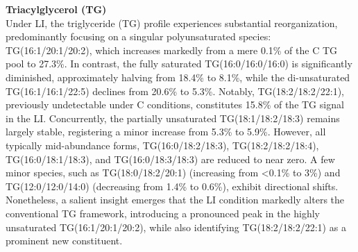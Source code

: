 \documentclass[10pt,letterpaper]{article}
\begin{document}
\textbf{Triacylglycerol (TG)}  \\
Under LI, the triglyceride (TG) profile experiences substantial reorganization, predominantly focusing on a singular polyunsaturated species: TG(16:1/20:1/20:2), which increases markedly from a mere 0.1\% of the C TG pool to 27.3\%. In contrast, the fully saturated TG(16:0/16:0/16:0) is significantly diminished, approximately halving from 18.4\% to 8.1\%, while the di-unsaturated TG(16:1/16:1/22:5) declines from 20.6\% to 5.3\%. Notably, TG(18:2/18:2/22:1), previously undetectable under C conditions, constitutes 15.8\% of the TG signal in the LI. Concurrently, the partially unsaturated TG(18:1/18:2/18:3) remains largely stable, registering a minor increase from 5.3\% to 5.9\%. However, all typically mid-abundance forms, TG(16:0/18:2/18:3), TG(18:2/18:2/18:4), TG(16:0/18:1/18:3), and TG(16:0/18:3/18:3) are reduced to near zero. A few minor species, such as TG(18:0/18:2/20:1) (increasing from \textless0.1\% to 3\%) and TG(12:0/12:0/14:0) (decreasing from 1.4\% to 0.6\%), exhibit directional shifts. Nonetheless, a salient insight emerges that the LI condition markedly alters the conventional TG framework, introducing a pronounced peak in the highly unsaturated TG(16:1/20:1/20:2), while also identifying TG(18:2/18:2/22:1) as a prominent new constituent.
\bigskip
\end{document}
